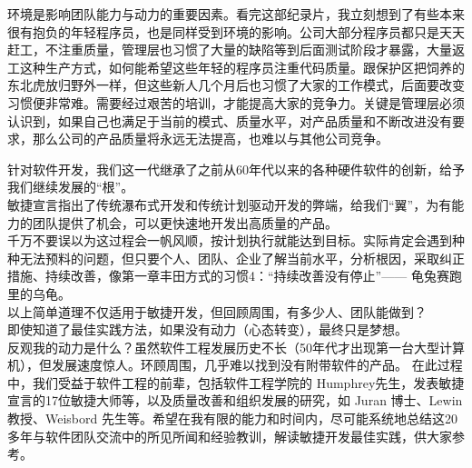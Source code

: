 环境是影响团队能力与动力的重要因素。看完这部纪录片，我立刻想到了有些本来很有抱负的年轻程序员，也是同样受到环境的影响。公司大部分程序员都只是天天赶工，不注重质量，管理层也习惯了大量的缺陷等到后面测试阶段才暴露，大量返工这种生产方式，如何能希望这些年轻的程序员注重代码质量。跟保护区把饲养的东北虎放归野外一样，但这些新人几个月后也习惯了大家的工作模式，后面要改变习惯便非常难。需要经过艰苦的培训，才能提高大家的竞争力。关键是管理层必须认识到，如果自己也满足于当前的模式、质量水平，对产品质量和不断改进没有要求，那么公司的产品质量将永远无法提高，也难以与其他公司竞争。

针对软件开发，我们这一代继承了之前从60年代以来的各种硬件软件的创新，给予我们继续发展的“根”。\\
敏捷宣言指出了传统瀑布式开发和传统计划驱动开发的弊端，给我们“翼”，为有能力的团队提供了机会，可以更快速地开发出高质量的产品。\\

千万不要误以为这过程会一帆风顺，按计划执行就能达到目标。实际肯定会遇到种种无法预料的问题，但只要个人、团队、企业了解当前水平，分析根因，采取纠正措施、持续改善，像第一章丰田方式的习惯4：“持续改善没有停止”—— 龟兔赛跑里的乌龟。\\

以上简单道理不仅适用于敏捷开发，但回顾周围，有多少人、团队能做到？\\
即使知道了最佳实践方法，如果没有动力（心态转变），最终只是梦想。\\
反观我的动力是什么？虽然软件工程发展历史不长（50年代才出现第一台大型计算机），但发展速度惊人。环顾周围，几乎难以找到没有附带软件的产品。 在此过程中，我们受益于软件工程的前辈，包括软件工程学院的 Humphrey先生，发表敏捷宣言的17位敏捷大师等，以及质量改善和组织发展的研究，如 Juran 博士、Lewin 教授、Weisbord 先生等。希望在我有限的能力和时间内，尽可能系统地总结这20多年与软件团队交流中的所见所闻和经验教训，解读敏捷开发最佳实践，供大家参考。 


